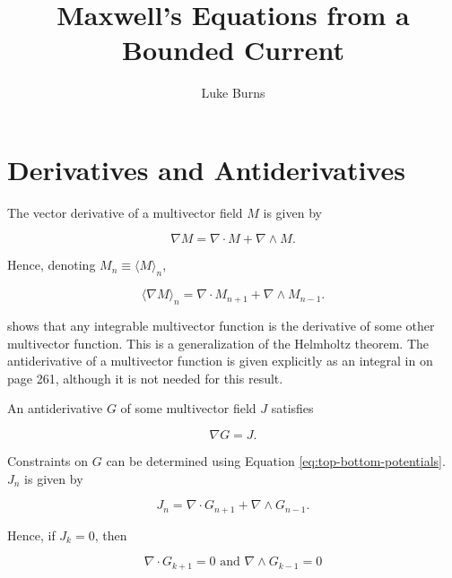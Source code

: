 \documentclass{article}
\title{Maxwell's Equations from a Bounded Current}
\author{Luke Burns}
\begin{document}
\maketitle
{}

\section{Derivatives and Antiderivatives}

The vector derivative of a multivector field $M$ is given by

\begin{equation}
  \nabla M = \nabla \cdot M + \nabla \wedge M.
\end{equation}

Hence, denoting $M_n \equiv \langle M \rangle_n$,

\begin{equation}
  \langle \nabla M \rangle_n = \nabla \cdot M_{n+1} + \nabla \wedge M_{n-1}.\label{eq:top-bottom-potentials}
\end{equation}

\cite{cagc} shows that any integrable multivector function is the derivative of some other multivector function. This is a generalization of the Helmholtz theorem. The antiderivative of a multivector function is given explicitly as an integral in \cite{cagc} on page 261, although it is not needed for this result.

An antiderivative $G$ of some multivector field $J$ satisfies

\begin{equation}
  \nabla G = J.
\end{equation}

Constraints on $G$ can be determined using Equation \ref{eq:top-bottom-potentials}. $J_n$ is given by

\begin{equation}
  J_n = \nabla \cdot G_{n+1} + \nabla \wedge G_{n-1}.\label{eq:potential-grade}
\end{equation}

Hence, if $J_k = 0$, then

\begin{equation}
  \nabla \cdot G_{k+1} = 0 \text{ and } \nabla \wedge G_{k-1} = 0\label{eq:constraints}
\end{equation}
\end{document}

